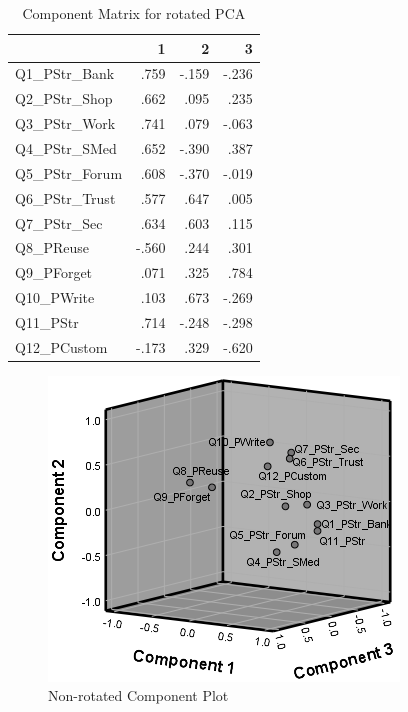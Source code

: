 \documentclass[letterpaper, 10 pt, conference]{ieeeconf}  %
\begin{document}
\begin{table}[h]
\caption{Component Matrix for rotated PCA}
\label{tab:compmatrixrot}
\begin{center}
\begin{tabular}{lrrr}
\hline
                & 1     & 2     & 3     \\ \hline
Q1\_PStr\_Bank  & .759  & -.159 & -.236 \\ \hline
Q2\_PStr\_Shop  & .662  & .095  & .235  \\ \hline
Q3\_PStr\_Work  & .741  & .079  & -.063 \\ \hline
Q4\_PStr\_SMed  & .652  & -.390 & .387  \\ \hline
Q5\_PStr\_Forum & .608  & -.370 & -.019 \\ \hline
Q6\_PStr\_Trust & .577  & .647  & .005  \\ \hline
Q7\_PStr\_Sec   & .634  & .603  & .115  \\ \hline
Q8\_PReuse      & -.560 & .244  & .301  \\ \hline
Q9\_PForget     & .071  & .325  & .784  \\ \hline
Q10\_PWrite     & .103  & .673  & -.269 \\ \hline
Q11\_PStr       & .714  & -.248 & -.298 \\ \hline
Q12\_PCustom    & -.173 & .329  & -.620 \\ \hline
\end{tabular}
\end{center}
\end{table}

\begin{figure}[thpb]
  \centering
    \includegraphics[scale=0.84]{compplot1.PNG}
  \caption{Non-rotated Component Plot}
  \label{fig:compplot}
\end{figure}
  
\end{document}
